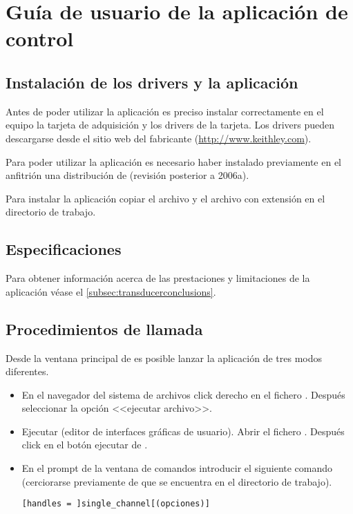\chapter{Guía de usuario de la aplicación de control}\label{chap:appendixA}

\section{Instalación de los drivers y la aplicación}

Antes de poder utilizar la aplicación es preciso instalar correctamente en
el equipo la tarjeta de adquisición y los drivers de la tarjeta. Los
drivers pueden descargarse desde el sitio web del fabricante
(\url{http://www.keithley.com}).

Para poder utilizar la aplicación es necesario haber instalado previamente
en el \pc{} anfitrión una distribución de \matlab{} (revisión posterior a
2006a).

Para instalar la aplicación copiar el archivo  y el
archivo con extensión  en el directorio de
trabajo.


\section{Especificaciones}

Para obtener información acerca de las prestaciones y limitaciones de la
aplicación véase el \vref{subsec:transducerconclusions}.


\section{Procedimientos de llamada}

Desde la ventana principal de \matlab{} es posible lanzar la aplicación de
tres modos diferentes.

\begin{itemize}
    \item En el navegador del sistema de archivos click derecho en el
	fichero . Después seleccionar la opción
	<<ejecutar archivo>>.
    \item Ejecutar  (editor de interfaces gráficas de usuario).
	Abrir el fichero . Después click en el
	botón ejecutar de .
    \item En el prompt de la ventana de comandos introducir el siguiente
	comando (cerciorarse previamente de que \matlab{} se encuentra en
	el directorio de trabajo).

	\begin{center}
	    \begin{lstlisting}[gobble=12]
		[handles = ]single_channel[(opciones)]
	    \end{lstlisting}
	\end{center}
\end{itemize}

